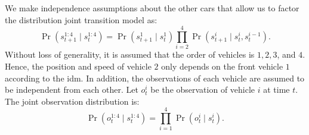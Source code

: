 We make independence assumptions about the other cars that allow us to factor the distribution joint transition model as:
\begin{equation}
    \Pr(s_{t+1}^{1:4} \mid s_{t}^{1:4}) = \Pr(s_{t+1}^{1}\mid s_t^1)\prod_{i=2}^4\Pr(s_{t+1}^{i}\mid s_t^i, s_t^{i-1}).
    \label{eq:transition}
\end{equation}
Without loss of generality, it is assumed that the order of vehicles is $1, 2, 3$, and $4$. Hence, the position and speed of vehicle $2$ only depends on the front vehicle $1$ according to the \gls{idm}. In addition, the observations of each vehicle are assumed to be independent from each other. 
Let $o^i_t$ be the observation of vehicle $i$ at time $t$. The joint observation distribution is:
\begin{equation}
    \Pr(o^{1:4}_t \mid s_t^{1:4}) = \prod_{i=1}^4\Pr(o^i_t \mid  s_t^i).
    \label{eq:observation}
\end{equation}


